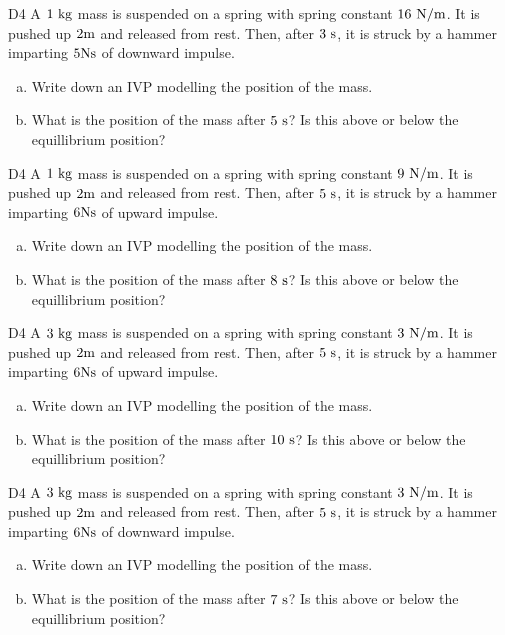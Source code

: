 \begin{problem}{D4}
A \(1\ {\rm kg}\) mass is suspended on a spring with spring constant \(16\ {\rm N/m}\).  It is pushed up \(2 {\rm m}\) and released from rest.  Then, after \(3\ {\rm s}\), it is struck by a hammer imparting \(5 {\rm Ns}\) of downward impulse.
\begin{enumerate}[(a)]
\item Write down an IVP modelling the position of the mass.
\item What is the position of the mass after \(5 \ {\rm s}\)?  Is this above or below the equillibrium position?
\end{enumerate}
\end{problem}

\begin{problem}{D4}
A \(1\ {\rm kg}\) mass is suspended on a spring with spring constant \(9\ {\rm N/m}\).  It is pushed up \(2 {\rm m}\) and released from rest.  Then, after \(5\ {\rm s}\), it is struck by a hammer imparting \(6 {\rm Ns}\) of upward impulse.
\begin{enumerate}[(a)]
\item Write down an IVP modelling the position of the mass.
\item What is the position of the mass after \(8 \ {\rm s}\)?  Is this above or below the equillibrium position?
\end{enumerate}
\end{problem}

\begin{problem}{D4}
A \(3\ {\rm kg}\) mass is suspended on a spring with spring constant \(3\ {\rm N/m}\).  It is pushed up \(2 {\rm m}\) and released from rest.  Then, after \(5\ {\rm s}\), it is struck by a hammer imparting \(6 {\rm Ns}\) of upward impulse.
\begin{enumerate}[(a)]
\item Write down an IVP modelling the position of the mass.
\item What is the position of the mass after \(10 \ {\rm s}\)?  Is this above or below the equillibrium position?
\end{enumerate}
\end{problem}

\begin{problem}{D4}
A \(3\ {\rm kg}\) mass is suspended on a spring with spring constant \(3\ {\rm N/m}\).  It is pushed up \(2 {\rm m}\) and released from rest.  Then, after \(5\ {\rm s}\), it is struck by a hammer imparting \(6 {\rm Ns}\) of downward impulse.
\begin{enumerate}[(a)]
\item Write down an IVP modelling the position of the mass.
\item What is the position of the mass after \(7 \ {\rm s}\)?  Is this above or below the equillibrium position?
\end{enumerate}
\end{problem}
